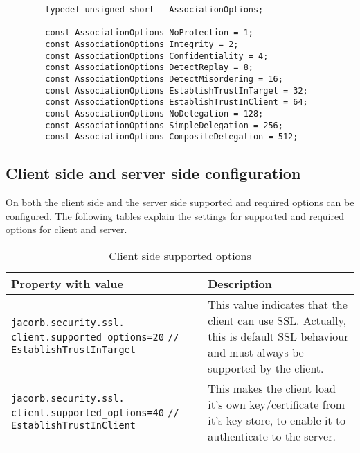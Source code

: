 \begin{verbatim}
        typedef unsigned short   AssociationOptions;

        const AssociationOptions NoProtection = 1;
        const AssociationOptions Integrity = 2;
        const AssociationOptions Confidentiality = 4;
        const AssociationOptions DetectReplay = 8;
        const AssociationOptions DetectMisordering = 16;
        const AssociationOptions EstablishTrustInTarget = 32;
        const AssociationOptions EstablishTrustInClient = 64;
        const AssociationOptions NoDelegation = 128;
        const AssociationOptions SimpleDelegation = 256;
        const AssociationOptions CompositeDelegation = 512;
\end{verbatim}


\subsection{Client side and server side configuration}
On both the client side and the server side supported and required
options can be configured. The following tables explain the settings
for supported and required options for client and server.

\begin{table}
\caption{Client side supported options}
\begin{tabular}{|p{7cm}|p{7cm}|}
\hline
\textbf{Property with value}& \textbf{Description}\\
\hline
\verb"jacorb.security.ssl."
\verb"client.supported_options=20"
\verb"// EstablishTrustInTarget"& This value indicates that the client can use SSL. Actually, this
is default SSL behaviour and must always be supported by the client.\\
\hline
\verb"jacorb.security.ssl."
\verb"client.supported_options=40"
\verb"// EstablishTrustInClient"& This makes
the client load it's own key/certificate from it's key
store, to enable it to authenticate to the server. \\
\hline
\end{tabular}
\end{table}


